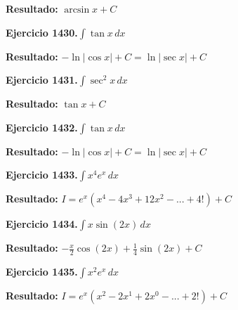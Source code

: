 \documentclass[10pt,a4paper]{article}
\begin{document}
\begin{solbox}
\textbf{Resultado:} \(\displaystyle \arcsin x + C\)
\end{solbox}

\begin{ejbox}
\textbf{Ejercicio 1430.}\quad $\int \tan x\,dx$
\end{ejbox}

\begin{solbox}
\textbf{Resultado:} \(\displaystyle -\ln|\cos x| + C = \ln|\sec x| + C\)
\end{solbox}

\begin{ejbox}
\textbf{Ejercicio 1431.}\quad $\int \sec^2 x\,dx$
\end{ejbox}

\begin{solbox}
\textbf{Resultado:} \(\displaystyle \tan x + C\)
\end{solbox}

\newpage
\begin{ejbox}
\textbf{Ejercicio 1432.}\quad $\int \tan x\,dx$
\end{ejbox}

\begin{solbox}
\textbf{Resultado:} \(\displaystyle -\ln|\cos x| + C = \ln|\sec x| + C\)
\end{solbox}

\begin{ejbox}
\textbf{Ejercicio 1433.}\quad $\int x^{4} e^x\,dx$
\end{ejbox}

\begin{solbox}
\textbf{Resultado:} \(\displaystyle I = e^x(x^{4} - 4x^{3} + 12x^{2} - ... + 4!) + C\)
\end{solbox}

\begin{ejbox}
\textbf{Ejercicio 1434.}\quad $\int x \sin(2x)\,dx$
\end{ejbox}

\begin{solbox}
\textbf{Resultado:} \(\displaystyle -\frac{x}{2}\cos(2x) + \frac{1}{4}\sin(2x) + C\)
\end{solbox}

\newpage
\begin{ejbox}
\textbf{Ejercicio 1435.}\quad $\int x^{2} e^x\,dx$
\end{ejbox}

\begin{solbox}
\textbf{Resultado:} \(\displaystyle I = e^x(x^{2} - 2x^{1} + 2x^{0} - ... + 2!) + C\)
\end{solbox}
\end{document}
